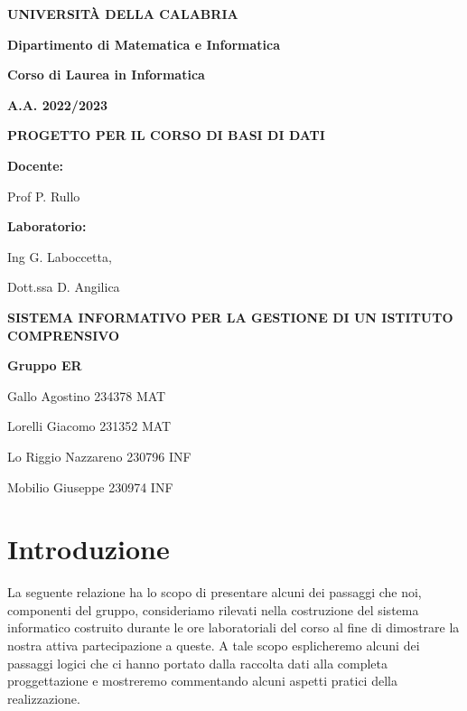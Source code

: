 \documentclass{article}
\begin{document}
\begin{titlepage}
    \centering
    \vskip 60pt
    \textbf{UNIVERSITÀ DELLA CALABRIA}
    
    \textbf{Dipartimento di Matematica e Informatica}
    
    \textbf{Corso di Laurea in Informatica}

    \textbf{A.A. 2022/2023}
    
    \vspace{1.5cm}
    
    \textbf{PROGETTO PER IL CORSO DI BASI DI DATI}
    
    \vspace{2.8cm}
    
    \textbf{Docente:}
    
     Prof P. Rullo

    \vspace{0.5 cm}
    
    \textbf{Laboratorio:}

    Ing G. Laboccetta, 
    
    Dott.ssa D. Angilica
    
    \vspace{2.8cm}
    \textbf{SISTEMA INFORMATIVO PER LA GESTIONE DI UN ISTITUTO COMPRENSIVO}

    \vspace{4.5 cm}
    \textbf{Gruppo ER}

    Gallo Agostino 234378 MAT
    
    Lorelli Giacomo 231352 MAT
    
    Lo Riggio Nazzareno 230796 INF
    
    Mobilio Giuseppe 230974 INF

    

\end{titlepage}

\section{Introduzione}
La seguente relazione ha lo scopo di presentare alcuni dei passaggi che noi, componenti del gruppo, consideriamo rilevati nella costruzione del sistema informatico costruito durante le ore laboratoriali del corso al fine di dimostrare la nostra attiva partecipazione a queste. A tale scopo esplicheremo alcuni dei passaggi logici che ci hanno portato dalla raccolta dati alla completa proggettazione e mostreremo commentando alcuni aspetti pratici della realizzazione.
\end{document}
